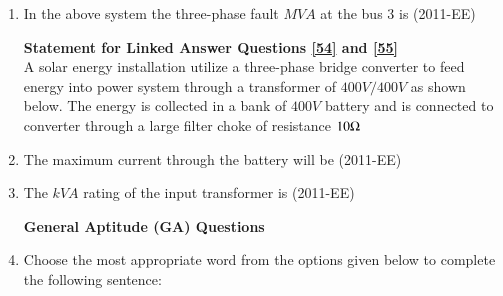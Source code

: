\documentclass[journal]{IEEEtran}
\begin{document}
\begin{enumerate}
    \item In the above system the three-phase fault $MVA$
 at the bus $3$
 is \hfill(2011-EE)
 \begin{enumerate}
 \end{enumerate}
 \textbf{Statement for Linked Answer Questions \ref{54} and \ref{55}} \\
 A solar energy installation utilize a three-phase bridge converter to feed energy into power system through a transformer of $400V/400V$
 as shown below. The energy is collected in a bank of 
 $400V$
 battery and is connected to converter through a large filter choke of resistance $10 \ohm$ 
  
 \item The maximum current through the battery will be \label{54} \hfill(2011-EE)
 \begin{enumerate}
 \end{enumerate}
 \item The $kVA$
 rating of the input transformer is \label{55} \hfill (2011-EE)
 \begin{enumerate}
 \end{enumerate}
 \textbf{General Aptitude (GA) Questions}\\
 \item Choose the most appropriate word from the options given below to complete the following sentence: \\

\end{enumerate}
\end{document}
